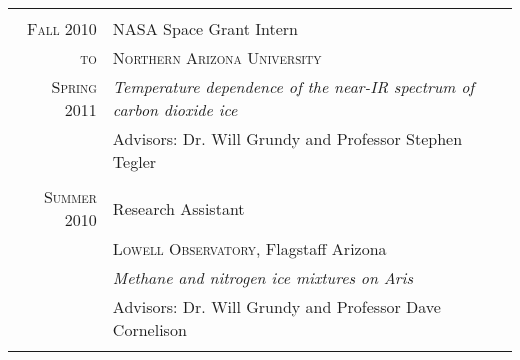 \documentclass[letterpaper,10pt]{article} %
\begin{document}
\begin{tabularx}{\textwidth}{r|p{11cm}}
\multicolumn{2}{c}{} \\


\textsc{Fall 2010} & NASA Space Grant Intern\\
\textsc{to} & \textsc{Northern Arizona University} \\
\textsc{Spring 2011} &\emph{Temperature dependence of the near-IR spectrum of carbon dioxide ice}\\ 
& Advisors: Dr. Will Grundy and Professor Stephen Tegler \\

\multicolumn{2}{c}{} \\


\textsc{Summer 2010} & Research Assistant \\
& \textsc{Lowell Observatory}, Flagstaff Arizona \\
&\emph{Methane and nitrogen ice mixtures on Aris}\\ 
& Advisors: Dr. Will Grundy and Professor Dave Cornelison \\

\multicolumn{2}{c}{} \\


\end{tabularx}
\end{document}
